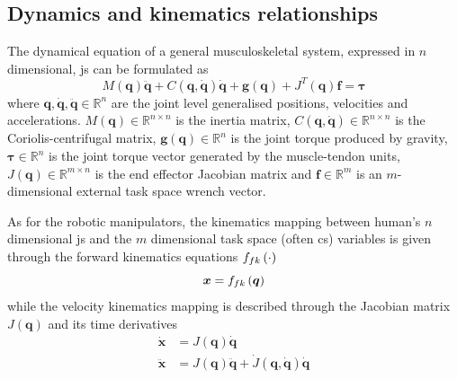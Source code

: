 \subsection{Dynamics and kinematics relationships}
\label{ch:human_dyn_kin}
The dynamical equation of a general musculoskeletal system, expressed in $n$ dimensional, \gls{js} can be formulated as
\begin{equation}
    M(\bm{q})\ddot{\bm{q}} + C(\bm{q},\dot{\bm{q}})\dot{\bm{q}} + \bm{g}(\bm{q}) + J^{T}(\bm{q})\bm{f} = \bm{\tau} 
    \label{eq:human_dynamics}
\end{equation}
where $\bm{q},\dot{\bm{q}},\ddot{\bm{q}} \in \mathbb{R}^n $ are the joint level generalised positions, velocities and accelerations. $M(\bm{q})\in \mathbb{R}^{n\times n}$ is the inertia matrix, $C (\bm{q}, \dot{\bm{q}})\in \mathbb{R}^{n\times n}$ is the Coriolis-centrifugal matrix, $\bm{g}(\bm{q})\in \mathbb{R}^n$ is the joint torque produced by gravity, $\bm{\tau}\in \mathbb{R}^n$ is the joint torque vector generated by the muscle-tendon units, $J(\bm{q})\in\mathbb{R}^{m\times n}$ is the end effector Jacobian matrix and $\bm{f} \in \mathbb{R}^m$ is an $m$-dimensional external task space wrench vector.

As for the robotic manipulators, the kinematics mapping between human's $n$ dimensional \gls{js} and the  $m$ dimensional task space (often \gls{cs}) variables is given through the forward kinematics equations $f_{fk}\left(\cdot\right)$ 
\begin{equation}
    \bm{x} = f_{fk}\left(\bm{q}\right)
\end{equation}
while the velocity kinematics mapping is described through the Jacobian matrix $J(\bm{q})$ and its time derivatives
\begin{subequations}
\begin{align}
\dot{\bm{x}}&= {J}(\bm{q})\dot{\bm{q}} \label{eq:js_to_cs_vaj_human:vel}\\
\ddot{\bm{x}}&= J(\bm{q})\ddot{\bm{q}} + \dot{J}(\bm{q},\dot{\bm{q}})\dot{\bm{q}} \label{eq:js_to_cs_vaj_human:accel}
 \end{align} \label{eq:js_to_cs_vaj_human}
\end{subequations}

